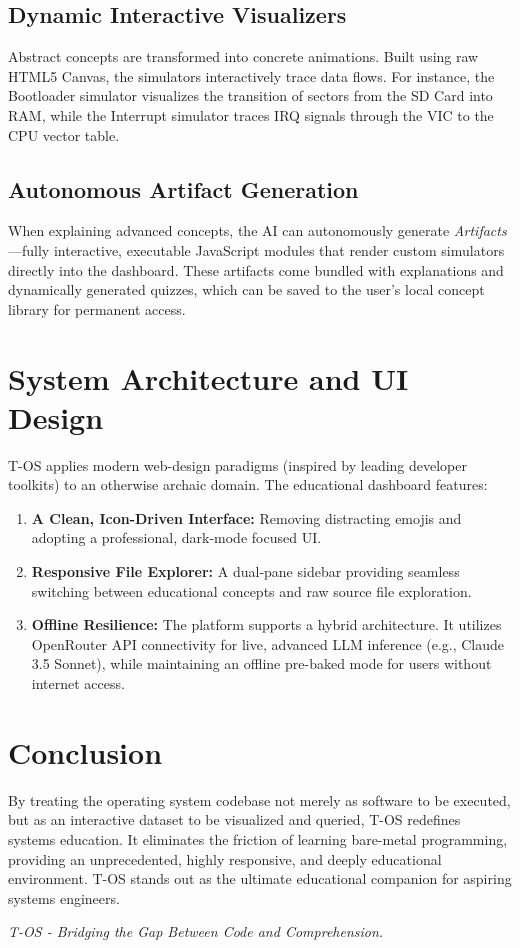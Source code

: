 \documentclass[a4paper,11pt]{article}
\begin{document}
\subsection{Dynamic Interactive Visualizers}
Abstract concepts are transformed into concrete animations. Built using raw HTML5 Canvas, the simulators interactively trace data flows. For instance, the Bootloader simulator visualizes the transition of sectors from the SD Card into RAM, while the Interrupt simulator traces IRQ signals through the VIC to the CPU vector table. 

\subsection{Autonomous Artifact Generation}
When explaining advanced concepts, the AI can autonomously generate \textit{Artifacts}—fully interactive, executable JavaScript modules that render custom simulators directly into the dashboard. These artifacts come bundled with explanations and dynamically generated quizzes, which can be saved to the user's local concept library for permanent access.

\section{System Architecture and UI Design}
T-OS applies modern web-design paradigms (inspired by leading developer toolkits) to an otherwise archaic domain. The educational dashboard features:
\begin{enumerate}
    \item \textbf{A Clean, Icon-Driven Interface:} Removing distracting emojis and adopting a professional, dark-mode focused UI.
    \item \textbf{Responsive File Explorer:} A dual-pane sidebar providing seamless switching between educational concepts and raw source file exploration.
    \item \textbf{Offline Resilience:} The platform supports a hybrid architecture. It utilizes OpenRouter API connectivity for live, advanced LLM inference (e.g., Claude 3.5 Sonnet), while maintaining an offline pre-baked mode for users without internet access.
\end{enumerate}

\section{Conclusion}
By treating the operating system codebase not merely as software to be executed, but as an interactive dataset to be visualized and queried, T-OS redefines systems education. It eliminates the friction of learning bare-metal programming, providing an unprecedented, highly responsive, and deeply educational environment. T-OS stands out as the ultimate educational companion for aspiring systems engineers.

\vfill
\begin{center}
    \small \textit{T-OS - Bridging the Gap Between Code and Comprehension.}
\end{center}
\end{document}
